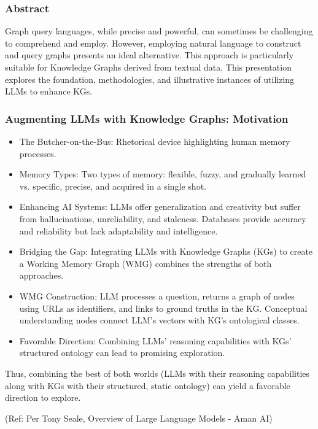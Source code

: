 \begin{frame}[fragile]\frametitle{Abstract}

Graph query languages, while precise and powerful, can sometimes be challenging to comprehend and employ. 
However, employing natural language to construct and query graphs presents an ideal alternative. 
This approach is particularly suitable for Knowledge Graphs derived from textual data. 
This presentation explores the foundation, methodologies, and illustrative instances of utilizing LLMs to enhance KGs.


\end{frame}

\begin{frame}[fragile]\frametitle{Augmenting LLMs with Knowledge Graphs: Motivation}

\begin{itemize}
\item The Butcher-on-the-Bus: Rhetorical device highlighting human memory processes.
\item Memory Types: Two types of memory: flexible, fuzzy, and gradually learned vs. specific, precise, and acquired in a single shot.
\item Enhancing AI Systems: LLMs offer generalization and creativity but suffer from hallucinations, unreliability, and staleness. Databases provide accuracy and reliability but lack adaptability and intelligence.
\item Bridging the Gap: Integrating LLMs with Knowledge Graphs (KGs) to create a Working Memory Graph (WMG) combines the strengths of both approaches.
\item WMG Construction: LLM processes a question, returns a graph of nodes using URLs as identifiers, and links to ground truths in the KG. Conceptual understanding nodes connect LLM's vectors with KG's ontological classes.
\item Favorable Direction: Combining LLMs' reasoning capabilities with KGs' structured ontology can lead to promising exploration.
\end{itemize}

Thus, combining the best of both worlds (LLMs with their reasoning capabilities along with KGs with their structured, static ontology) can yield a favorable direction to explore.

{\tiny (Ref: Per Tony Seale, Overview of Large Language Models - Aman AI)}

\end{frame}

